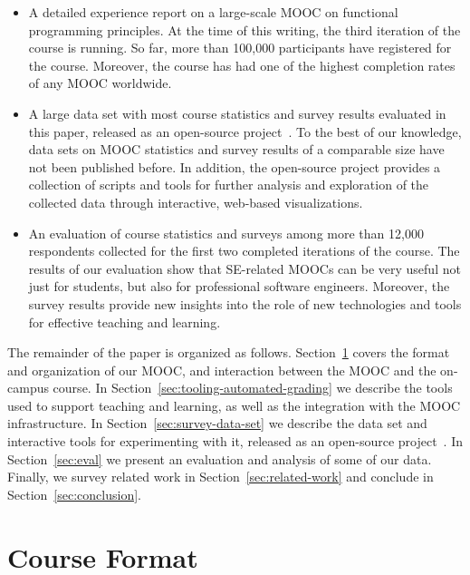 \documentclass{sig-alternate}
\begin{document}
\begin{itemize}

\item A detailed experience report on a large-scale MOOC on functional programming
  principles. At the time of this writing, the third iteration of the course is running. So far,
  more than 100,000 participants have registered for the course. Moreover, the course has had
  one of the highest completion rates of any MOOC worldwide.

\item A large data set with most course statistics and survey results evaluated in this paper,
  released as an open-source project~\cite{progfun-stats}. To the best of our knowledge, data
  sets on MOOC statistics and survey results of a comparable size have not been published
  before. In addition, the open-source project provides a collection of scripts and tools for
  further analysis and exploration of the collected data through interactive, web-based
  visualizations.

\item An evaluation of course statistics and surveys among more than 12,000 respondents
  collected for the first two completed iterations of the course. The results of our evaluation show that SE-related MOOCs can be very useful not just for students, but
  also for professional software engineers.
  Moreover, the survey results provide new insights into the role of new technologies and tools
  for effective teaching and learning.

\end{itemize}

The remainder of the paper is organized as follows. Section~\ref{sec:course-format} covers the format and organization of our MOOC, and interaction between the MOOC and the on-campus course. In Section~\ref{sec:tooling-automated-grading} we describe the tools used to support teaching and learning, as well as the integration with the MOOC infrastructure. In Section~\ref{sec:survey-data-set} we describe the data set and interactive tools for experimenting with it, released as an open-source project~\cite{progfun-stats}. In Section~\ref{sec:eval} we present an evaluation and analysis of some of our data. Finally, we survey related work in Section~\ref{sec:related-work} and conclude in Section~\ref{sec:conclusion}.


\section{Course Format}
\label{sec:course-format}
\end{document}

